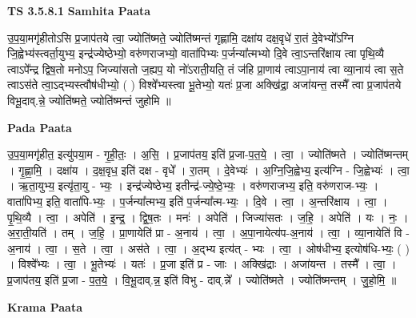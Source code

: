 \documentclass[17pt]{extarticle}
\begin{document}
\textbf{TS 3.5.8.1 } \newline
\textbf{Samhita Paata} \newline

उ॒प॒या॒मगृ॑हीतोऽसि प्र॒जाप॑तये त्वा॒ ज्योति॑ष्मते॒ ज्योति॑ष्मन्तं गृह्णामि॒ दक्षा॑य दक्ष॒वृधे॑ रा॒तं दे॒वेभ्यो᳚ऽग्नि जि॒ह्वेभ्य॑स्त्वर्ता॒युभ्य॒ इन्द्र॑ज्येष्ठेभ्यो॒ वरु॑णराजभ्यो॒ वाता॑पिभ्यः प॒र्जन्या᳚त्मभ्यो दि॒वे त्वा॒ऽन्तरि॑क्षाय त्वा पृथि॒व्यै त्वाऽपे᳚न्द्र द्विष॒तो मनोऽप॒ जिज्या॑सतो ज॒ह्यप॒ यो नो॑ऽराती॒यति॒ तं ज॑हि प्रा॒णाय॑ त्वाऽपा॒नाय॑ त्वा व्या॒नाय॑ त्वा स॒ते त्वाऽस॑ते त्वा॒ऽद्भ्यस्त्वौष॑धीभ्यो॒ ( ) विश्वे᳚भ्यस्त्वा भू॒तेभ्यो॒ यतः॑ प्र॒जा अक्खि॑द्रा॒ अजा॑यन्त॒ तस्मै᳚ त्वा प्र॒जाप॑तये विभू॒दाव्.न्ने॒ ज्योति॑ष्मते॒ ज्योति॑ष्मन्तं जुहोमि ॥ \newline

\textbf{Pada Paata} \newline

उ॒प॒या॒मगृ॑हीत॒ इत्यु॑पया॒म - गृ॒ही॒तः॒ । अ॒सि॒ । प्र॒जाप॑तय॒ इति॑ प्र॒जा-प॒त॒ये॒ । त्वा॒ । ज्योति॑ष्मते । ज्योति॑ष्मन्तम् । गृ॒ह्णा॒मि॒ । दक्षा॑य । द॒क्ष॒वृध॒ इति॑ दक्ष - वृधे᳚ । रा॒तम् । दे॒वेभ्यः॑ । अ॒ग्नि॒जि॒ह्वेभ्य॒ इत्य॑ग्नि - जि॒ह्वेभ्यः॑ । त्वा॒ । ऋ॒ता॒युभ्य॒ इत्यृ॑ता॒यु - भ्यः॒ । इन्द्र॑ज्येष्ठेभ्य॒ इतीन्द्र॑-ज्ये॒ष्ठे॒भ्यः॒ । वरु॑णराजभ्य॒ इति॒ वरु॑णराज-भ्यः॒ । वाता॑पिभ्य॒ इति॒ वाता॑पि-भ्यः॒ । प॒र्जन्या᳚त्मभ्य॒ इति॑ प॒र्जन्या᳚त्म-भ्यः॒ । दि॒वे । त्वा॒ । अ॒न्तरि॑क्षाय । त्वा॒ । पृ॒थि॒व्यै । त्वा॒ । अपेति॑ । इ॒न्द्र॒ । द्वि॒ष॒तः । मनः॑ । अपेति॑ । जिज्या॑सतः । ज॒हि॒ । अपेति॑ । यः । नः॒ । अ॒रा॒ती॒यति॑ । तम् । ज॒हि॒ । प्रा॒णायेति॑ प्रा - अ॒नाय॑ । त्वा॒ । अ॒पा॒नायेत्य॑प-अ॒नाय॑ । त्वा॒ । व्या॒नायेति॑ वि - अ॒नाय॑ । त्वा॒ । स॒ते । त्वा॒ । अस॑ते । त्वा॒ । अ॒द्भ्य इत्य॑त् - भ्यः । त्वा॒ । ओष॑धीभ्य॒ इत्योष॑धि-भ्यः॒ ( ) । विश्वे᳚भ्यः । त्वा॒ । भू॒तेभ्यः॑ । यतः॑ । प्र॒जा इति॑ प्र - जाः । अक्खि॑द्राः । अजा॑यन्त । तस्मै᳚ । त्वा॒ । प्र॒जाप॑तय॒ इति॑ प्र॒जा - प॒त॒ये॒ । वि॒भू॒दाव्.न्न॒ इति॑ विभु - दाव्.न्ने᳚ । ज्योति॑ष्मते । ज्योति॑ष्मन्तम् । जु॒हो॒मि॒ ॥  \newline


\textbf{Krama Paata} \newline
\end{document}
